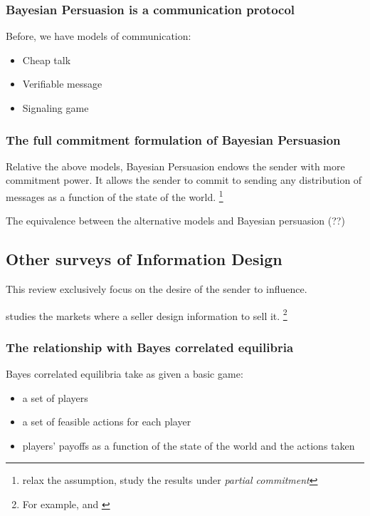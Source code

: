 \documentclass[12pt,letterpaper]{article}
\theoremstyle{definition}   %
\begin{document}
\subsubsection*{Bayesian Persuasion is a communication protocol}

Before, we have models of communication: 
\begin{itemize}
	\item Cheap talk \citep{crawford1982strategic}
	\item Verifiable message \citep{grossman1981informational,milgrom1981good}
	\item Signaling game \citep{spence1978job}
\end{itemize}

\subsubsection*{The full commitment formulation of Bayesian Persuasion}

Relative the above models, Bayesian Persuasion endows the sender with more commitment power. It allows the sender to commit to sending any distribution of messages as a function of the state of the world. \footnote{\cite{min2020bayesian} relax the assumption, study the results under \emph{partial commitment}}

The equivalence between the alternative models and Bayesian persuasion (??) \citep{gentzkow2017disclosure}

\subsection*{Other surveys of Information Design}

This review exclusively focus on the desire of the sender to influence.

\cite{bergemann2019markets} studies the markets where a seller design information to sell it. \footnote{For example, \cite{bergemann2018design} and \cite{kastl2018selling}}

\subsubsection*{The relationship with Bayes correlated equilibria \citep{bergemann2013robust}}

Bayes correlated equilibria take as given a basic game: 
\begin{itemize}
	\item a set of players
	\item a set of feasible actions for each player
	\item players' payoffs as a function of the state of the world and the actions taken
\end{itemize}
\end{document}
